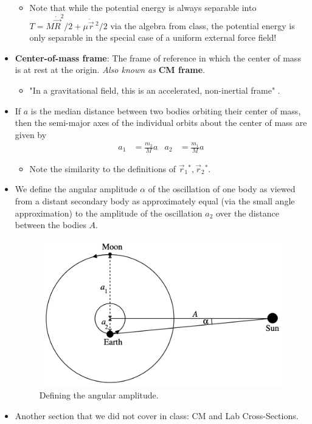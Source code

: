 \documentclass[../notes.tex]{subfiles}
\begin{document}
\begin{itemize}
\begin{itemize}
        \item Note that while the potential energy is always separable into $T=M\dot{\vec{R}}^2/2+\mu\dot{\vec{r}}{\,}^2/2$ via the algebra from class, the potential energy is only separable in the special case of a uniform external force field!
    \end{itemize}
    \item \textbf{Center-of-mass frame}: The frame of reference in which the center of mass is at rest at the origin. \emph{Also known as} \textbf{CM frame}.
    \begin{itemize}
        \item "In a gravitational field, this is an accelerated, non-inertial frame" \parencite[162]{bib:KibbleBerkshire}.
    \end{itemize}
    \item If $a$ is the median distance between two bodies orbiting their center of mass, then the semi-major axes of the individual orbits about the center of mass are given by
    \begin{align*}
        a_1 &= \frac{m_2}{M}a&
        a_2 &= \frac{m_1}{M}a
    \end{align*}
    \begin{itemize}
        \item Note the similarity to the definitions of $\vec{r}_1{}^*,\vec{r}_2{}^*$.
    \end{itemize}
    \item We define the angular amplitude $\alpha$ of the oscillation of one body as viewed from a distant secondary body as approximately equal (via the small angle approximation) to the amplitude of the oscillation $a_2$ over the distance between the bodies $A$.
    \begin{figure}[h!]
        \centering
        \includegraphics[width=0.5\linewidth]{../ExtFiles/angularAmplitude.png}
        \caption{Defining the angular amplitude.}
        \label{fig:angularAmplitude}
    \end{figure}
    \item Another section that we did not cover in class: CM and Lab Cross-Sections.
\end{itemize}
\end{document}
